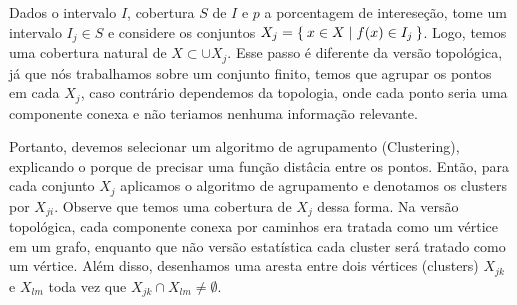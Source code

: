 Dados o intervalo $I$, cobertura $S$ de $I$ e $p$ a porcentagem de intereseção, tome um
intervalo $I_j \in S$ e considere os conjuntos $X_j = \Set{x \in X | f(x) \in I_j}$.
Logo, temos uma cobertura natural de $X \subset \cup X_j$. Esse passo é diferente da 
versão topológica, já que nós trabalhamos sobre um conjunto finito, temos que agrupar os pontos
em cada $X_j$, caso contrário dependemos da topologia, onde cada ponto seria uma componente conexa
e não teriamos nenhuma informação relevante. 

Portanto, devemos selecionar um algoritmo de agrupamento (Clustering), explicando o 
porque de precisar uma função distâcia entre os pontos. Então, para cada conjunto $X_j$ aplicamos 
o algoritmo de agrupamento e denotamos os clusters por $X_{ji}$. Observe que temos uma cobertura
de $X_j$ dessa forma. Na versão topológica, cada componente conexa por caminhos era tratada como
um vértice em um grafo, enquanto que não versão estatística cada cluster será tratado como
um vértice. Além disso, desenhamos uma aresta entre dois vértices (clusters) $X_{jk}$ e 
$X_{lm}$ toda vez que $X_{jk} \cap X_{lm} \neq \emptyset$.

